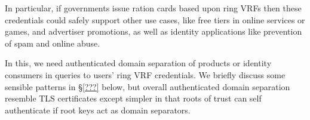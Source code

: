 In particular, if governments issue ration cards based upon ring VRFs
then these credentials could safely support other use cases, like
free tiers in online services or games, and advertiser promotions,
as well as identity applications like prevention of spam and online abuse.

In this, we need authenticated domain separation of products or identity
consumers in queries to users' ring VRF credentials.  We briefly discuss
some sensible patterns in \S\ref{???} below, but overall authenticated
domain separation resemble TLS certificates except simpler in that
roots of trust can self authenticate if root keys act as domain separators.





\endinput




As a field, anonymous credentials come in myriad flavors,
many of which exist to limits the anonymity provided, ala
 attribute based credentials and group signatures. %
%
Ring VRFs by weakening anonymity only contextually provide a safer,
more private, more flexible, more powerful, and more ethical
choice for all everyday anonymous credential use cases.  %


